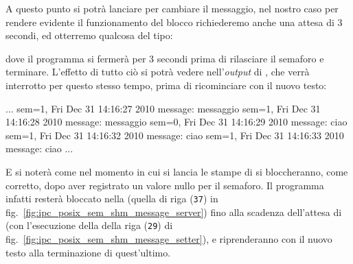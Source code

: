 A questo punto si potrà lanciare  per cambiare il
messaggio, nel nostro caso per rendere evidente il funzionamento del blocco
richiederemo anche una attesa di 3 secondi, ed otterremo qualcosa del tipo:
dove il programma si fermerà per 3 secondi prima di rilasciare il semaforo e
terminare. L'effetto di tutto ciò si potrà vedere nell'\textit{output} di
, che verrà interrotto per questo stesso tempo, prima di
ricominciare con il nuovo testo:
\begin{Console}
...
sem=1, Fri Dec 31 14:16:27 2010
message: messaggio
sem=1, Fri Dec 31 14:16:28 2010
message: messaggio
sem=0, Fri Dec 31 14:16:29 2010
message: ciao
sem=1, Fri Dec 31 14:16:32 2010
message: ciao
sem=1, Fri Dec 31 14:16:33 2010
message: ciao
...
\end{Console}

E si noterà come nel momento in cui si lancia  le stampe
di  si bloccheranno, come corretto, dopo aver registrato
un valore nullo per il semaforo.  Il programma infatti resterà bloccato nella
 (quella di riga (\texttt{\small 37}) in
fig.~\ref{fig:ipc_posix_sem_shm_message_server}) fino alla scadenza
dell'attesa di  (con l'esecuzione della 
della riga (\texttt{\small 29}) di
fig.~\ref{fig:ipc_posix_sem_shm_message_setter}), e riprenderanno con il nuovo
testo alla terminazione di quest'ultimo.


